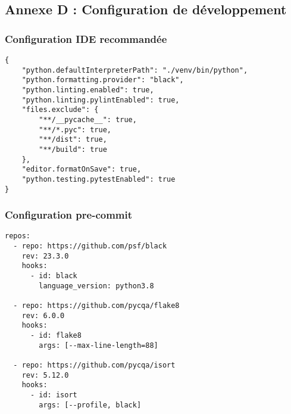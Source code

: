 \documentclass[12pt,a4paper]{article}
\begin{document}
\subsection{Annexe D : Configuration de développement}

\subsubsection{Configuration IDE recommandée}

\begin{codebox}
\begin{lstlisting}
{
    "python.defaultInterpreterPath": "./venv/bin/python",
    "python.formatting.provider": "black",
    "python.linting.enabled": true,
    "python.linting.pylintEnabled": true,
    "files.exclude": {
        "**/__pycache__": true,
        "**/*.pyc": true,
        "**/dist": true,
        "**/build": true
    },
    "editor.formatOnSave": true,
    "python.testing.pytestEnabled": true
}
\end{lstlisting}
\end{codebox}

\subsubsection{Configuration pre-commit}

\begin{lstlisting}[caption=.pre-commit-config.yaml]
repos:
  - repo: https://github.com/psf/black
    rev: 23.3.0
    hooks:
      - id: black
        language_version: python3.8
  
  - repo: https://github.com/pycqa/flake8
    rev: 6.0.0
    hooks:
      - id: flake8
        args: [--max-line-length=88]
  
  - repo: https://github.com/pycqa/isort
    rev: 5.12.0
    hooks:
      - id: isort
        args: [--profile, black]
\end{lstlisting}
\end{document}
